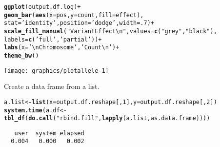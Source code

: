 \documentclass[9pt,english]{extarticle}\usepackage[]{graphicx}\usepackage[]{color}
\makeatletter
\newcommand{\hlnum}[1]{\textcolor[rgb]{0.686,0.059,0.569}{#1}}%
\newcommand{\hlstr}[1]{\textcolor[rgb]{0.192,0.494,0.8}{#1}}%
\newcommand{\hlopt}[1]{\textcolor[rgb]{0,0,0}{#1}}%
\newcommand{\hlstd}[1]{\textcolor[rgb]{0.345,0.345,0.345}{#1}}%
\newcommand{\hlkwb}[1]{\textcolor[rgb]{0.69,0.353,0.396}{#1}}%
\newcommand{\hlkwc}[1]{\textcolor[rgb]{0.333,0.667,0.333}{#1}}%
\newcommand{\hlkwd}[1]{\textcolor[rgb]{0.737,0.353,0.396}{\textbf{#1}}}%
\newenvironment{kframe}{%
 \def\at@end@of@kframe{}%
 \ifinner\ifhmode%
  \def\at@end@of@kframe{\end{minipage}}%
  \begin{minipage}{\columnwidth}%
 \fi\fi%
 \def\FrameCommand##1{\hskip\@totalleftmargin \hskip-\fboxsep
 \colorbox{shadecolor}{##1}\hskip-\fboxsep
     \hskip-\linewidth \hskip-\@totalleftmargin \hskip\columnwidth}%
 \MakeFramed {\advance\hsize-\width
   \@totalleftmargin\z@ \linewidth\hsize
   \@setminipage}}%
 {\par\unskip\endMakeFramed%
 \at@end@of@kframe}
\newenvironment{knitrout}{}{} %
\makeatother
\begin{document}
\begin{linenumbers}
\begin{knitrout}
\begin{kframe}
\begin{alltt}
\hlkwd{ggplot}\hlstd{(output.df.log)} \hlopt{+}
    \hlkwd{geom_bar}\hlstd{(}\hlkwd{aes}\hlstd{(}\hlkwc{x} \hlstd{= pos,} \hlkwc{y} \hlstd{= count,} \hlkwc{fill} \hlstd{= effect),}
             \hlkwc{stat} \hlstd{=} \hlstr{'identity'}\hlstd{,} \hlkwc{position} \hlstd{=} \hlstr{'dodge'}\hlstd{,} \hlkwc{width} \hlstd{=} \hlnum{.7}\hlstd{)} \hlopt{+}
    \hlkwd{scale_fill_manual}\hlstd{(}\hlstr{"Variant Effect\textbackslash{}n"}\hlstd{,} \hlkwc{values} \hlstd{=} \hlkwd{c}\hlstd{(}\hlstr{"grey"}\hlstd{,} \hlstr{"black"}\hlstd{),}
                      \hlkwc{labels} \hlstd{=} \hlkwd{c}\hlstd{(}\hlstr{'full'}\hlstd{,} \hlstr{'partial'}\hlstd{))} \hlopt{+}
    \hlkwd{labs}\hlstd{(}\hlkwc{x} \hlstd{=} \hlstr{'\textbackslash{}nChromosome'}\hlstd{,} \hlstr{'Count\textbackslash{}n'}\hlstd{)} \hlopt{+}
    \hlkwd{theme_bw}\hlstd{()}
\end{alltt}
\end{kframe}

{\centering \texttt{[image: graphics/plotallele-1]} 

}



\end{knitrout}

Create a data frame from a list.
\begin{knitrout}
\color{fgcolor}\begin{kframe}
\begin{alltt}
\hlstd{a.list} \hlkwb{<-} \hlkwd{list}\hlstd{(}\hlkwc{x}\hlstd{=output.df.reshape[,}\hlnum{1}\hlstd{],} \hlkwc{y}\hlstd{=output.df.reshape[,}\hlnum{2}\hlstd{])}
\hlkwd{system.time}\hlstd{(a.df} \hlkwb{<-} \hlkwd{tbl_df}\hlstd{(}\hlkwd{do.call}\hlstd{(}\hlstr{"rbind.fill"}\hlstd{,}\hlkwd{lapply}\hlstd{(a.list, as.data.frame))))}
\end{alltt}
\begin{verbatim}
   user  system elapsed 
  0.004   0.000   0.002 
\end{verbatim}
\end{kframe}
\end{knitrout}


\end{linenumbers}
\end{document}

